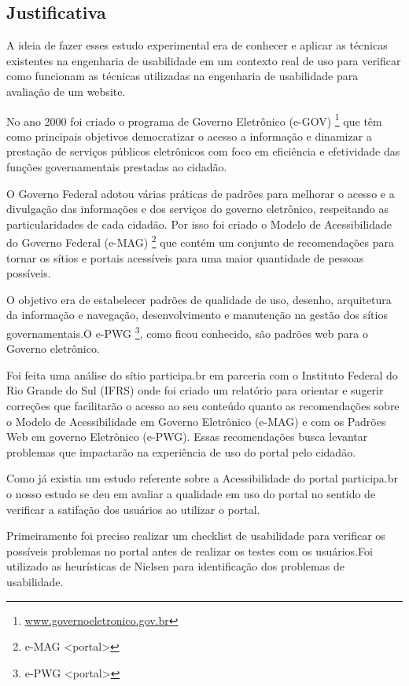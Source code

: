 \subsection{Justificativa}	

	A ideia de fazer esses estudo experimental era de conhecer e aplicar as técnicas existentes na engenharia de usabilidade em um contexto real de uso para verificar como funcionam as técnicas utilizadas na engenharia de usabilidade para avaliação de um website.
	
		


	No ano 2000 foi criado o programa de Governo Eletrônico (e-GOV) \footnote{\url{www.governoeletronico.gov.br}} que têm como principais objetivos democratizar o acesso a informação e dinamizar a prestação de serviços públicos eletrônicos com foco em eficiência e efetividade das funções governamentais prestadas ao cidadão.

	O Governo Federal adotou várias práticas de padrões para melhorar o acesso e a divulgação das informações e dos serviços do governo eletrônico, respeitando as particularidades de cada cidadão. Por isso foi criado o Modelo de Acessibilidade do Governo Federal (e-MAG) \footnote{e-MAG <portal>} que contém um conjunto de recomendações para tornar os sítios e portais acessíveis para uma maior quantidade de pessoas possíveis. 

	O objetivo era de estabelecer padrões de qualidade de uso, desenho, arquitetura da informação e navegação, desenvolvimento e manutenção na gestão dos sítios governamentais.O  e-PWG \footnote{e-PWG <portal>}, como ficou conhecido, são padrões web para o Governo eletrônico.

	Foi feita uma análise do sítio participa.br em parceria com o Instituto Federal do Rio Grande do Sul (IFRS) onde foi criado um relatório para orientar e sugerir correções que facilitarão o acesso ao seu conteúdo quanto as recomendações sobre o Modelo de Acessibilidade em Governo Eletrônico (e-MAG) e com os Padrões Web em governo Eletrônico (e-PWG). Essas recomendações busca levantar problemas que impactarão na experiência de uso do portal pelo cidadão.

	Como já existia um estudo referente sobre a Acessibilidade do portal participa.br o nosso estudo se deu em avaliar a qualidade em uso do portal no sentido de verificar a satifação dos usuários ao utilizar o portal.

	Primeiramente foi preciso realizar um checklist de usabilidade para verificar os possíveis problemas no portal antes de realizar os testes com os usuários.Foi utilizado as heurísticas de Nielsen para identificação dos problemas de usabilidade.

